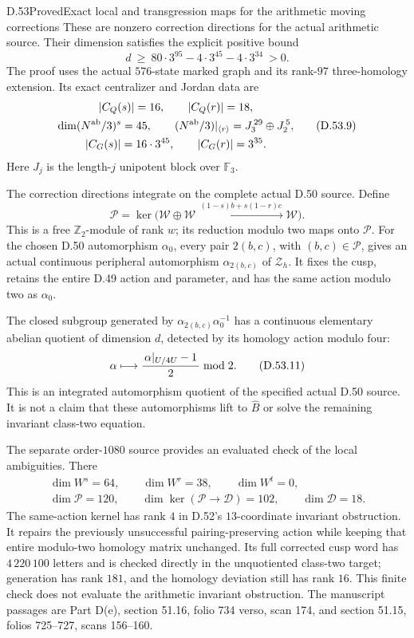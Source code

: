 \begin{statement}{D.53}{Proved}{Exact local and transgression maps for the arithmetic moving corrections}
These are nonzero correction directions for the
actual arithmetic source. Their dimension satisfies
the explicit positive bound
\[
       d\ \ge\
          80\cdot3^{95}-4\cdot3^{45}-4\cdot3^{34}
          \ >0 .
 \tag{D.53.8}
\]
The proof uses the actual \(576\)-state marked
graph and its rank-\(97\) three-homology extension.
Its exact centralizer and Jordan data are
\[
 \begin{gathered}
 |C_Q(s)|=16,\qquad |C_Q(r)|=18,\\
 \dim(N^{\rm ab}/3)^s=45,\qquad
 (N^{\rm ab}/3)|_{\langle r\rangle}
      =J_3^{\,29}\oplus J_2^{\,5},\\
 |C_G(s)|=16\cdot3^{45},\qquad |C_G(r)|=3^{35}.
 \end{gathered}
 \tag{D.53.9}
\]
Here \(J_j\) is the length-\(j\) unipotent block
over \(\mathbb F_3\).

The correction directions integrate on the
complete actual D.50 source. Define
\[
 \mathscr P=
 \ker\bigl(\mathscr W\oplus\mathscr W
       \xrightarrow{\, (1-s)b+s(1-r)c\,}\mathscr W\bigr).
 \tag{D.53.10}
\]
This is a free \(\mathbb Z_2\)-module of rank \(w\);
its reduction modulo two maps onto \(\mathcal P\).
For the chosen D.50 automorphism \(\alpha_0\),
every pair \(2(b,c)\), with \((b,c)\in\mathscr P\),
gives an actual continuous peripheral automorphism
\(\alpha_{2(b,c)}\) of \(\mathcal Z_h\).
It fixes the cusp, retains the entire D.49 action
and parameter, and has the same action modulo two
as \(\alpha_0\).

The closed subgroup generated by
\(\alpha_{2(b,c)}\alpha_0^{-1}\) has a continuous
elementary abelian quotient of dimension \(d\),
detected by its homology action modulo four:
\[
 \alpha\longmapsto
       {\,\alpha|_{U/4U}-1\,\over2}\bmod2 .
 \tag{D.53.11}
\]
This is an integrated automorphism quotient of
the specified actual D.50 source. It is not a
claim that these automorphisms lift to
\(\widehat B\) or solve the remaining invariant
class-two equation.

The separate order-\(1080\) source provides an
evaluated check of the local ambiguities.
There
\[
 \begin{gathered}
 \dim W^s=64,\qquad \dim W^r=38,\qquad \dim W^t=0,\\
 \dim\mathcal P=120,\qquad \dim\ker(\mathcal P\to\mathscr D)=102,
 \qquad \dim\mathscr D=18 .
 \end{gathered}
 \tag{D.53.12}
\]
The same-action kernel has rank \(4\) in
D.52's \(13\)-coordinate invariant obstruction.
It repairs the previously unsuccessful
pairing-preserving action while keeping that
entire modulo-two homology matrix unchanged.
Its full corrected cusp word has
\(4\,220\,100\) letters and is checked directly
in the unquotiented class-two target; generation
has rank \(181\), and the homology deviation
still has rank \(16\). This finite check does
not evaluate the arithmetic invariant obstruction.
The manuscript passages are Part D(e),
section 51.16, folio 734 verso, scan 174,
and section 51.15, folios 725--727,
scans 156--160.
\end{statement}
